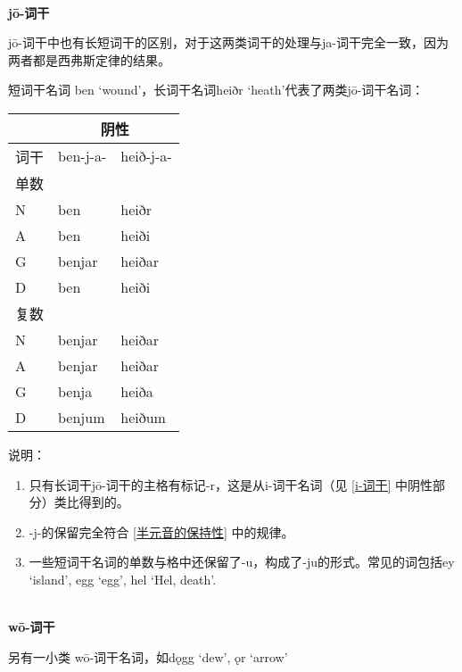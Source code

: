 ~\\
\textbf{jō-词干}

jō-词干中也有长短词干的区别，对于这两类词干的处理与ja-词干完全一致，因为两者都是西弗斯定律的结果。

短词干名词 ben `wound'，长词干名词heiðr `heath'代表了两类jō-词干名词：

\begin{longtable}{lll}
  \toprule
       & \multicolumn{2}{c}{\textbf{阴性}}             \\
  \midrule
  \endhead
  \bottomrule
  \endfoot
  词干 & ben-j-a-                 & heið-j-a- \\
  单数 &                          &           \\
  N    & ben                      & heiðr     \\
  A    & ben                      & heiði     \\
  G    & benjar                   & heiðar    \\
  D    & ben                      & heiði     \\
  复数 &                          &           \\
  N    & benjar                   & heiðar    \\
  A    & benjar                   & heiðar    \\
  G    & benja                    & heiða     \\
  D    & benjum                   & heiðum    \\
\end{longtable}

说明：

\begin{enumerate}[1)]

  \item
        只有长词干jō-词干的主格有标记-r，这是从i-词干名词（见 \ref{i-词干} 中阴性部分）类比得到的。
  \item
        -j-的保留完全符合 \ref{半元音的保持性} 中的规律。
  \item
        一些短词干名词的单数与格中还保留了-u，构成了-ju的形式。常见的词包括ey
        `island', egg `egg', hel `Hel, death'.
\end{enumerate}

~\\
\textbf{wō-词干}

另有一小类 wō-词干名词，如dǫgg `dew', ǫr `arrow'

